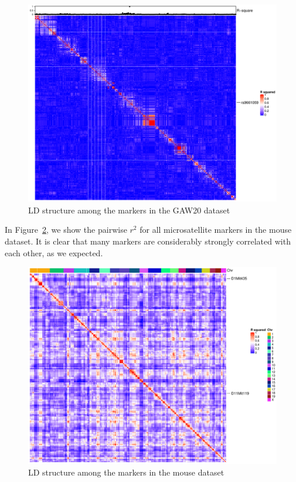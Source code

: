 \documentclass[12pt,letter]{article}\usepackage[]{graphicx}\usepackage[]{color}
\begin{document}
\begin{figure}[H]
	\centering
	\includegraphics[width=1\linewidth]{figure/gaw20R2}
	\caption{LD structure among the markers in the GAW20 dataset}
	\label{fig:gaw20r2}
\end{figure}

In Figure~\ref{fig:miceR2}, we show the pairwise $r^2$ for all microsatellite markers in the mouse dataset. It is clear that many markers are considerably strongly correlated with each other, as we expected.

\begin{figure}[H]
	\centering
	\includegraphics[width=1\linewidth]{figure/miceR2}
	\caption{LD structure among the markers in the mouse dataset}
	\label{fig:miceR2}
\end{figure}
\end{document}
